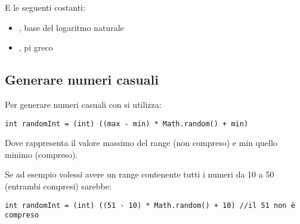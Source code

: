 \documentclass[../main.tex]{subfiles}
\begin{document}
E le seguenti costanti:
\begin{itemize}
    \item {}, base del logaritmo naturale
    \item {}, pi greco
\end{itemize}

\subsection{Generare numeri casuali}
Per generare numeri casuali con  si utilizza:
\begin{lstlisting}[style=java]
    int randomInt = (int) ((max - min) * Math.random() + min)
\end{lstlisting}
Dove  rappresenta il valore massimo del range (non compreso) e min quello minimo (compreso).

Se ad esempio volessi avere un range contenente tutti i numeri da 10 a 50 (entrambi compresi) sarebbe:
\begin{lstlisting}[style=java]
    int randomInt = (int) ((51 - 10) * Math.random() + 10) //il 51 non è compreso
\end{lstlisting}
\end{document}
